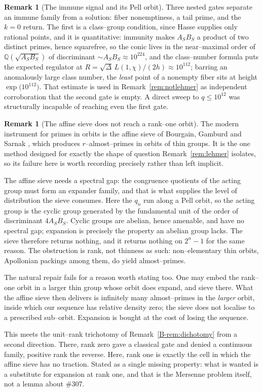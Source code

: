 \documentclass[11pt]{article}
\theoremstyle{definition}
\newtheorem{remark}[theorem]{Remark}
\begin{document}
\begin{remark}[The immune signal and its Pell orbit]
Three nested gates separate an immune family from a solution: fiber nonemptiness, a tail prime, and
the $k=0$ return. The first is a class--group condition, since Hasse supplies only rational points,
and it is quantitative: immunity makes $A_SB_S$ a product of two distinct primes, hence squarefree,
so the conic lives in the near--maximal order of $\mathbb{Q}(\sqrt{A_SB_S})$ of discriminant
${\sim}A_SB_S\approx10^{224}$, and the class--number formula puts the expected regulator at
$R=\sqrt\Delta\,L(1,\chi)/(2h)\approx10^{112}$; barring an anomalously large class number, the
\emph{least} point of a nonempty fiber sits at height $\exp\bigl(10^{112}\bigr)$. That estimate is
used in Remark~\ref{rem:notlehmer} as independent corroboration that the second gate is empty. A
direct sweep to $q\le10^{12}$ was structurally incapable of reaching even the first gate.
\end{remark}

\begin{remark}[The affine sieve does not reach a rank--one orbit]\label{rem:affinesieve}
The modern instrument for primes in orbits is the affine sieve of Bourgain, Gamburd and Sarnak
\cite{BGS2010}, which produces $r$--almost--primes in orbits of thin groups. It is the one method
designed for exactly the shape of question Remark~\ref{rem:lehmer} isolates, so its failure here is
worth recording precisely rather than left implicit.

The affine sieve needs a spectral gap: the congruence quotients of the acting group must form an
expander family, and that is what supplies the level of distribution the sieve consumes. Here the
$q_n$ run along a Pell orbit, so the acting group is the cyclic group generated by the fundamental
unit of the order of discriminant $4A_SB_S$. Cyclic groups are abelian, hence amenable, and have no
spectral gap; expansion is precisely the property an abelian group lacks. The sieve therefore
returns nothing, and it returns nothing on $2^n-1$ for the same reason. The obstruction is rank, not
thinness as such: non--elementary thin orbits, Apollonian packings among them, do yield
almost--primes.

The natural repair fails for a reason worth stating too. One may embed the rank--one orbit in a
larger thin group whose orbit does expand, and sieve there. What the affine sieve then delivers is
infinitely many almost--primes in the \emph{larger} orbit, inside which our sequence has relative
density zero; the sieve does not localise to a prescribed sub--orbit. Expansion is bought at the
cost of losing the sequence.

This meets the unit--rank trichotomy of Remark~\ref{B-rem:dichotomy} from a second direction. There,
rank zero gave a classical gate and denied a continuous family, positive rank the reverse. Here,
rank one is exactly the cell in which the affine sieve has no traction. Stated as a single missing
property: what is wanted is a substitute for expansion at rank one, and that is the Mersenne problem
itself, not a lemma about \#307.
\end{remark}
\end{document}
